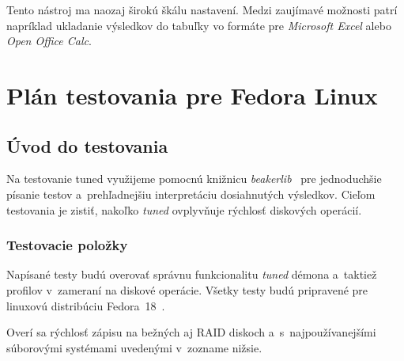 Tento nástroj ma naozaj širokú škálu nastavení. Medzi zaujímavé možnosti patrí napríklad ukladanie výsledkov do tabuľky vo formáte pre \emph{Microsoft Excel} alebo \emph{Open Office Calc}.

%
%

\chapter{Plán testovania pre Fedora Linux}


\section{Úvod do testovania}

Na testovanie tuned využijeme pomocnú knižnicu
\emph{beakerlib}~\cite{beakerlibHomepage} pre jednoduchšie písanie testov
a~prehľadnejšiu interpretáciu dosiahnutých výsledkov. Cieľom testovania je
zistiť, nakoľko \emph{tuned} ovplyvňuje rýchlosť diskových operácií.

\subsection*{Testovacie položky}

Napísané testy budú overovať správnu funkcionalitu \emph{tuned} démona a~taktiež
profilov v~zameraní na diskové operácie. Všetky testy budú
pripravené pre linuxovú distribúciu Fedora~18~\cite{fedoraHomepage}.

Overí sa rýchlosť zápisu na bežných aj RAID diskoch a~s~najpoužívanejšími
súborovými systémami uvedenými v~zozname nižsie.

